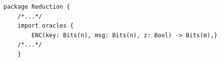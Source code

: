 \begin{longlisting}
\begin{verbatim}
package Reduction {
    /*...*/
    import oracles {
        ENC(key: Bits(n), msg: Bits(n), z: Bool) -> Bits(m),}
    /*...*/
    }
\end{verbatim}
\caption{Importing Oracle  in }
\label{lst:importoracle}
\end{longlisting}